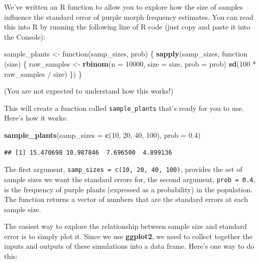 \documentclass[]{book}
\newenvironment{Shaded}{\begin{snugshade}}{\end{snugshade}}
\newcommand{\KeywordTok}[1]{\textcolor[rgb]{0.13,0.29,0.53}{\textbf{{#1}}}}
\newcommand{\DataTypeTok}[1]{\textcolor[rgb]{0.13,0.29,0.53}{{#1}}}
\newcommand{\DecValTok}[1]{\textcolor[rgb]{0.00,0.00,0.81}{{#1}}}
\newcommand{\FloatTok}[1]{\textcolor[rgb]{0.00,0.00,0.81}{{#1}}}
\newcommand{\StringTok}[1]{\textcolor[rgb]{0.31,0.60,0.02}{{#1}}}
\newcommand{\NormalTok}[1]{{#1}}
\begin{document}
We've written an R function to allow you to explore how the size of
samples influence the standard error of purple morph frequency
estimates. You can read this into R by running the following line of R
code (just copy and paste it into the Console):

\begin{Shaded}
\begin{Highlighting}[]
\NormalTok{sample_plants <-}\StringTok{ }\NormalTok{function(samp_sizes, prob) \{}
  \KeywordTok{sapply}\NormalTok{(samp_sizes, function (size) \{}
    \NormalTok{raw_samples <-}\StringTok{ }\KeywordTok{rbinom}\NormalTok{(}\DataTypeTok{n =} \DecValTok{10000}\NormalTok{, }\DataTypeTok{size =} \NormalTok{size, }\DataTypeTok{prob =} \NormalTok{prob)}
    \KeywordTok{sd}\NormalTok{(}\DecValTok{100} \NormalTok{*}\StringTok{ }\NormalTok{raw_samples /}\StringTok{ }\NormalTok{size)}
  \NormalTok{\})}
\NormalTok{\}}
\end{Highlighting}
\end{Shaded}

(You are not expected to understand how this works!)

This will create a function called \texttt{sample\_plants} that's ready
for you to use. Here's how it works:

\begin{Shaded}
\begin{Highlighting}[]
\KeywordTok{sample_plants}\NormalTok{(}\DataTypeTok{samp_sizes =} \KeywordTok{c}\NormalTok{(}\DecValTok{10}\NormalTok{, }\DecValTok{20}\NormalTok{, }\DecValTok{40}\NormalTok{, }\DecValTok{100}\NormalTok{), }\DataTypeTok{prob =} \FloatTok{0.4}\NormalTok{)}
\end{Highlighting}
\end{Shaded}

\begin{verbatim}
## [1] 15.470698 10.987846  7.696500  4.899136
\end{verbatim}

The first argument, \texttt{samp\_sizes\ =\ c(10,\ 20,\ 40,\ 100)},
provides the set of sample sizes we want the standard errors for, the
second argument, \texttt{prob\ =\ 0.4}, is the frequency of purple
plants (expressed as a probability) in the population. The function
returns a vector of numbers that are the standard errors at each sample
size.

The easiest way to explore the relationship between sample size and
standard error is to simply plot it. Since we use \textbf{ggplot2}, we
need to collect together the inputs and outputs of these simulations
into a data frame. Here's one way to do this:
\end{document}
